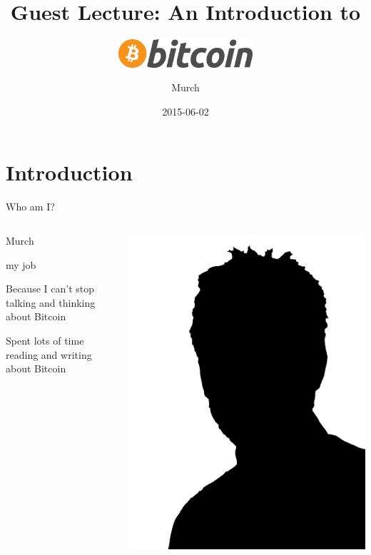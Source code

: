 \documentclass[12pt, usepdftitle=false]{beamer}
\title[Bitcoin]{Guest Lecture: An Introduction to \vspace*{1em}}
\subtitle{\includegraphics[width=5cm]{btcLogo}}
\author{Murch}
\date{2015-06-02}
\begin{document}
\frame[plain]{\titlepage}

\frame{\tableofcontents}

\section{Introduction}
\frame{\tableofcontents[currentsection]}

\begin{frame}{Who am I?}
\begin{columns}[c]
\begin{column}{.7\textwidth}
	\begin{description}[leftmargin=0em]
		\item[Name:] Murch
		\item[Job:] my job 
		\item[Why here?] Because I can't stop talking and thinking about Bitcoin
		\item[Qualification:] Spent lots of time reading and writing about Bitcoin
	\end{description}
\end{column}
\begin{column}{.3\textwidth}
\includegraphics[width=.8\textwidth]{ME}
\end{column}
\end{columns}
\end{frame}
\end{document}
